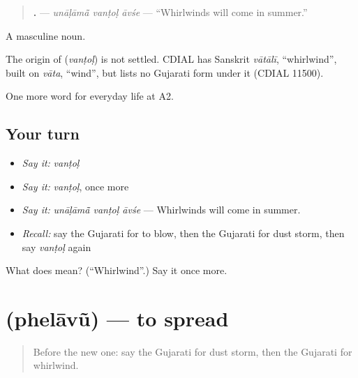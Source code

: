 \begin{quote}
\textbf{  .} — \emph{unāḷāmā̃ vanṭoḷ āvśe} — \textquotedblleft{}Whirlwinds will come in summer.\textquotedblright{}
\end{quote}

A masculine noun.

\begin{cousinweb}
The origin of \textbf{} (\emph{vanṭoḷ}) is not settled. CDIAL has Sanskrit \emph{vātālī}, \textquotedblleft{}whirlwind\textquotedblright{}, built on \emph{vāta}, \textquotedblleft{}wind\textquotedblright{}, but lists no Gujarati form under it (CDIAL 11500).
\end{cousinweb}

\begin{grammarlens}[title={What you've built}]
One more word for everyday life at A2.
\end{grammarlens}

\subsection*{Your turn}
\begin{itemize}
\raggedright
  \item \emph{Say it:} \emph{vanṭoḷ}
  \item \emph{Say it:} \emph{vanṭoḷ}, once more
  \item \emph{Say it:} \emph{unāḷāmā̃ vanṭoḷ āvśe} — Whirlwinds will come in summer.
  \item \emph{Recall:} say the Gujarati for to blow, then the Gujarati for dust storm, then say \emph{vanṭoḷ} again
\end{itemize}

\begin{tcolorbox}[breakable,colback=teal!4,colframe=teal!35!black,title={Before you move on}]
What does  mean? (\textquotedblleft{}Whirlwind\textquotedblright{}.) Say it once more.
\end{tcolorbox}
\section[\texorpdfstring{\gu{ફેલાવું} (phelāvũ)}{ફેલાવું (phelāvũ)}]{ (phelāvũ) — to spread}

\label{lesson:GU-C217-phelavu}



\begin{quote}
Before the new one: say the Gujarati for dust storm, then the Gujarati for whirlwind.
\end{quote}

